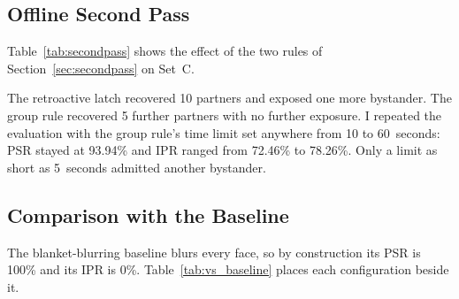 \subsection{Offline Second Pass}
\label{sec:results_secondpass}

Table~\ref{tab:secondpass} shows the effect of the two rules of
Section~\ref{sec:secondpass} on Set~C.

\begin{table}[htbp]
\begin{singlespace}
\centering
\caption{Effect of the offline second pass on Set~C (102 clips, 95\% Wilson intervals).}
\label{tab:secondpass}
\renewcommand{\arraystretch}{1.3}
\end{singlespace}
\end{table}

The retroactive latch recovered 10 partners and exposed one more bystander. The group rule
recovered 5 further partners with no further exposure. I repeated the evaluation with the
group rule's time limit set anywhere from 10 to 60~seconds: PSR stayed at 93.94\% and IPR
ranged from 72.46\% to 78.26\%. Only a limit as short as 5~seconds admitted another
bystander.

\subsection{Comparison with the Baseline}
\label{sec:baseline_comparison}

The blanket-blurring baseline blurs every face, so by construction its PSR is 100\% and its
IPR is 0\%. Table~\ref{tab:vs_baseline} places each configuration beside it.

